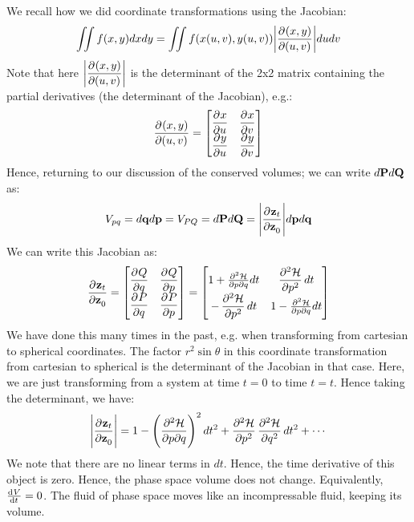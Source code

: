 \documentclass[../PHYS306Notes.tex]{subfiles}
\begin{document}
\begin{s}
We recall how we did coordinate transformations using the Jacobian:
\[\iint f(x, y)dxdy = \iint f(x(u, v), y(u, v)) \abs{\dpd{(x,y)}{(u, v)}}dudv\]
Note that here $\abs{\dpd{(x,y)}{(u, v)}}$ is the determinant of the 2x2 matrix containing the partial derivatives (the determinant of the Jacobian), e.g.:
\[\dpd{(x,y)}{(u, v)} = \m{\dpd{x}{u} & \dpd{x}{v} \\ \dpd{y}{u} & \dpd{y}{v}}\]
Hence, returning to our discussion of the conserved volumes; we can write $d\mathbf{P}d\mathbf{Q}$ as:
\[V_{pq} = d\v{q}d\v{p} = V_{PQ} = d\v{P}d\v{Q} = \abs{\dpd{\v{z}_t}{\v{z}_0}}d\v{p}d\v{q}\]
We can write this Jacobian as:
\[\dpd{\v{z}_t}{\v{z}_0} = \m{\dpd{Q}{q} & \dpd{Q}{p} \\ \dpd{P}{q} & \dpd{P}{p}} = \m{1 + \pdv{\HH}{p}{q}dt & \dpd[2]{\HH}{p}dt \\ -\dpd[2]{\HH}{p}dt & 1 - \pdv{\HH}{p}{q}dt }\]
We have done this many times in the past, e.g. when transforming from cartesian to spherical coordinates. The factor $r^2\sin\theta$ in this coordinate transformation from cartesian to spherical is the determinant of the Jacobian in that case. Here, we are just transforming from a system at time $t = 0$ to time $t = t$. Hence taking the determinant, we have:
\[\abs{\dpd{\v{z}_t}{\v{z}_0}} = 1 - \left(\pdv{\HH}{p}{q}\right)^2dt^2 + \dpd[2]{\HH}{p}\dpd[2]{\HH}{q}dt^2 + \cdots \]
We note that there are no linear terms in $dt$. Hence, the time derivative of this object is zero. Hence, the phase space volume does not change. Equivalently, $\od{V}{t} = 0$. The fluid of phase space moves like an incompressable fluid, keeping its volume. 
\end{s} 
\end{document}

